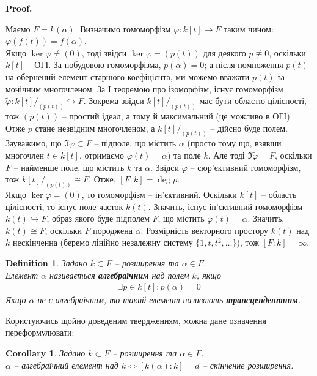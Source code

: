 \documentclass[a4paper, 10pt]{article}
\makeatletter
\theoremstyle{theoremdd}
\theoremstyle{theoremdd}
\newtheorem{definition}[theorem]{Definition}
\theoremstyle{theoremdd}
\theoremstyle{theoremdd}
\theoremstyle{theoremdd}
\theoremstyle{theoremdd}
\theoremstyle{theoremdd}
\theoremstyle{theoremdd}
\theoremstyle{theoremdd}
\theoremstyle{theoremdd}
\theoremstyle{theoremdd}
\theoremstyle{theoremdd}
\theoremstyle{theoremdd}
\theoremstyle{theoremdd}
\newtheorem{corollary}[theorem]{Corollary}
\theoremstyle{theoremdd}
\renewenvironment{proof}[1][Proof.\\]{\par
\pushQED{\hfill \qed}%
\normalfont \topsep6\p@\@plus6\p@\relax
\trivlist
\item\relax
{\bfseries
#1\@addpunct{.}}\hspace\labelsep\ignorespaces
}{%
\popQED\endtrivlist\@endpefalse
}
\makeatother
\begin{document}
\begin{proof}
Маємо $F = k(\alpha)$. Визначимо гомоморфізм $\varphi \colon k[t] \to F$ таким чином: $\varphi(f(t)) = f(\alpha)$.\\
Якщо $\ker \varphi \neq (0)$, тоді звідси $\ker \varphi = (p(t))$ для деякого $p \not\equiv 0$, оскільки $k[t]$ -- ОГІ. За побудовою гомоморфізма, $p(\alpha) = 0$; а після помноження $p(t)$ на обернений елемент старшого коефіцієнта, ми можемо вважати $p(t)$ за монічним многочленом. За І теоремою про ізоморфізм, існує гомоморфізм $\tilde{\varphi} \colon k[t]/_{(p(t))} \hookrightarrow F$. Зокрема звідси $k[t]/_{(p(t))}$ має бути областю цілісності, тож $(p(t))$ -- простий ідеал, а тому й максимальний (це можливо в ОГІ). Отже $p$ стане незвідним многочленом, а $k[t]/_{(p(t))}$ -- дійсно буде полем. Зауважимо, що $\Im \tilde{\varphi} \subset F$ -- підполе, що містить $\alpha$ (просто тому що, взявши многочлен $t \in k[t]$, отримаємо $\varphi(t) = \alpha$) та поле $k$. Але тоді $\Im \tilde{\varphi} = F$, оскільки $F$ -- найменше поле, що містить $k$ та $\alpha$. Звідси $\tilde{\varphi}$ -- сюр'єктивний гомоморфізм, тож $k[t]/_{(p(t))} \cong F$. Отже, $[F:k] = \deg p$.\\
Якщо $\ker \varphi = (0)$, то гомоморфізм -- ін'єктивний. Оскільки $k[t]$ -- область цілісності, то існує поле часток $k(t)$. Значить, існує ін'єктивний гомоморфізм $k(t) \hookrightarrow F$, образ якого буде підполем $F$, що містить $\varphi(t) = \alpha$. Значить, $k(t) \cong F$, оскільки $F$ породжена $\alpha$. Розмірність векторного простору $k(t)$ над $k$ нескінченна (беремо лінійно незалежну систему $\{1,t,t^2,\dots\}$), тож $[F:k] = \infty$.
\end{proof}

\begin{definition}
Задано $k \subset F$ -- розширення та $\alpha \in F$.\\
Елемент $\alpha$ називається \textbf{алгебраїчним} над полем $k$, якщо
\begin{align*}
\exists p \in k[t]: p(\alpha) = 0
\end{align*}
Якщо $\alpha$ не є алгебраїчним, то такий елемент називають \textbf{трансцендентним}.
\end{definition}

Користуючись щойно доведеним твердженням, можна дане означення переформулювати:
\begin{corollary}
Задано $k \subset F$ -- розширення та $\alpha \in F$.\\
$\alpha$ -- алгебраїчний елемент над $k \iff [k(\alpha) : k] = d$ -- скінченне розширення.
\end{corollary}
\end{document}
